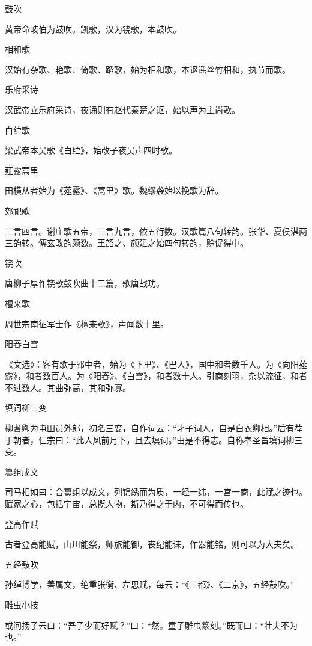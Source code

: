 \documentclass[a4paper,12pt,UTF8,twoside]{ctexbook}
\begin{document}
    鼓吹
    
    黄帝命岐伯为鼓吹。凯歌，汉为铙歌，本鼓吹。
    
    相和歌
    
    汉始有杂歌、艳歌、倚歌、蹈歌，始为相和歌，本讴谣丝竹相和，执节而歌。
    
    乐府采诗
    
    汉武帝立乐府采诗，夜诵则有赵代秦楚之讴，始以声为主尚歌。
    
    白纻歌
    
    梁武帝本吴歌《白纻》，始改子夜吴声四时歌。
    
    薤露蒿里
    
    田横从者始为《薤露》、《蒿里》歌。魏缪袭始以挽歌为辞。
    
    郊祀歌
    
    三言四言。谢庄歌五帝，三言九言，依五行数。汉歌篇八句转韵。张华、夏侯湛两三韵转。傅玄改韵颇数。王韶之、颜延之始四句转韵，赊促得中。
    
    铙吹
    
    唐柳子厚作铙歌鼓吹曲十二篇，歌唐战功。
    
    檀来歌
    
    周世宗南征军士作《檀来歌》，声闻数十里。
    
    阳春白雪
    
    《文选》：客有歌于郢中者，始为《下里》、《巴人》，国中和者数千人。为《向阳薤露》，和者数百人。为《阳春》、《白雪》，和者数十人。引商刻羽，杂以流征，和者不过数人。其曲弥高，其和弥寡。
    
    填词柳三变
    
    柳耆卿为屯田员外郎，初名三变，自作词云：“才子词人，自是白衣卿相。”后有荐于朝者，仁宗曰：“此人风前月下，且去填词。”由是不得志。自称奉圣旨填词柳三变。
    
    纂组成文
    
    司马相如曰：合纂组以成文，列锦绣而为质，一经一纬，一宫一商，此赋之迹也。赋家之心，包括宇宙，总揽人物，斯乃得之于内，不可得而传也。
    
    登高作赋
    
    古者登高能赋，山川能祭，师旅能御，丧纪能诔，作器能铭，则可以为大夫矣。
    
    五经鼓吹
    
    孙绰博学，善属文，绝重张衡、左思赋，每云：“《三都》、《二京》，五经鼓吹。”
    
    雕虫小技
    
    或问扬子云曰：“吾子少而好赋？”曰：“然。童子雕虫篆刻。”既而曰：“壮夫不为也。”
    
\end{document}
